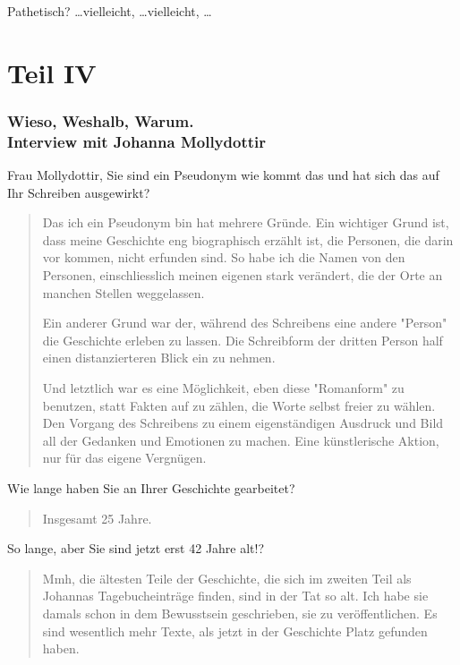 \documentclass[10pt,titlepage,a5paper]{book}
\newenvironment{tg}{\begin{quote}\em}{\end{quote}}
\begin{document}
 Pathetisch? \dots vielleicht, \dots vielleicht, \dots 
 
\part*{Teil IV}
 
 
 \section*{Wieso, Weshalb, Warum. \\Interview mit Johanna Mollydottir}




Frau Mollydottir, Sie sind ein Pseudonym wie kommt das und hat sich das auf Ihr Schreiben ausgewirkt?

\begin{tg}

Das ich ein Pseudonym bin hat mehrere Gründe. Ein wichtiger Grund ist, dass meine Geschichte eng biographisch erzählt ist, die Personen, die darin vor kommen, nicht erfunden sind. So habe ich die Namen von den Personen, einschliesslich meinen eigenen stark verändert, die der Orte an manchen Stellen weggelassen.

Ein anderer Grund war der, während des Schreibens eine andere "Person" die Geschichte erleben zu lassen. Die Schreibform der dritten Person half einen distanzierteren Blick ein zu nehmen. 

Und letztlich war es eine Möglichkeit, eben diese "Romanform"{} zu benutzen, statt Fakten auf zu zählen, die Worte selbst freier zu wählen. Den Vorgang des Schreibens zu einem eigenständigen Ausdruck und Bild all der Gedanken und Emotionen zu machen. Eine künstlerische Aktion, nur für das eigene Vergnügen.

\end{tg}

Wie lange haben Sie an Ihrer Geschichte gearbeitet?

\begin{tg}

Insgesamt 25 Jahre.

\end{tg}

So lange, aber Sie sind jetzt erst 42 Jahre alt!?

\begin{tg}
 
Mmh, die ältesten Teile der Geschichte, die sich im zweiten Teil als Johannas Tagebucheinträge finden, sind in der Tat so alt. Ich habe sie damals schon in dem Bewusstsein geschrieben, sie zu veröffentlichen. Es sind wesentlich mehr Texte, als jetzt in der Geschichte Platz gefunden haben.

\end{tg}
\end{document}
